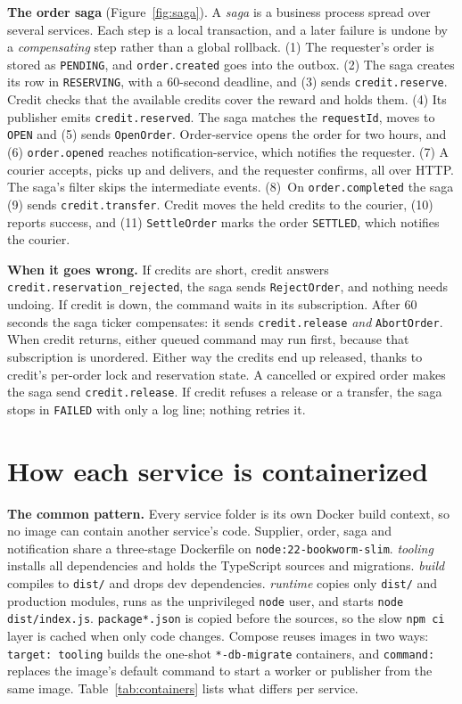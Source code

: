 \documentclass[11pt,a4paper]{article}
\newcommand{\code}[1]{\nolinkurl{#1}}
\begin{document}
\textbf{The order saga} (Figure~\ref{fig:saga}). A \emph{saga} is a business process spread over
several services. Each step is a local transaction, and a later failure is undone by a
\emph{compensating} step rather than a global rollback. (1) The requester's order is stored as
\code{PENDING}, and \code{order.created} goes into the outbox. (2) The saga creates its row in
\code{RESERVING}, with a 60-second deadline, and (3) sends \code{credit.reserve}. Credit checks
that the available credits cover the reward and holds them. (4) Its publisher emits
\code{credit.reserved}. The saga matches the \code{requestId}, moves to \code{OPEN} and (5) sends
\code{OpenOrder}. Order-service opens the order for two hours, and (6) \code{order.opened} reaches
notification-service, which notifies the requester. (7) A courier accepts, picks up and delivers,
and the requester confirms, all over HTTP. The saga's filter skips the intermediate events.
(8)~On \code{order.completed} the saga (9) sends \code{credit.transfer}. Credit moves the held
credits to the courier, (10) reports success, and (11) \code{SettleOrder} marks the order
\code{SETTLED}, which notifies the courier.

\textbf{When it goes wrong.} If credits are short, credit answers
\code{credit.reservation_rejected}, the saga sends \code{RejectOrder}, and nothing needs undoing.
If credit is down, the command waits in its subscription. After 60 seconds the saga ticker
compensates: it sends \code{credit.release} \emph{and} \code{AbortOrder}. When credit returns,
either queued command may run first, because that subscription is unordered. Either way the
credits end up released, thanks to credit's per-order lock and reservation state. A cancelled or
expired order makes the saga send \code{credit.release}. If credit refuses a release or a
transfer, the saga stops in \code{FAILED} with only a log line; nothing retries it.

\section{How each service is containerized}

\textbf{The common pattern.} Every service folder is its own Docker build context, so no image
can contain another service's code. Supplier, order, saga and notification share a three-stage
Dockerfile on \code{node:22-bookworm-slim}. \emph{tooling} installs all dependencies and holds
the TypeScript sources and migrations. \emph{build} compiles to \code{dist/} and drops dev
dependencies. \emph{runtime} copies only \code{dist/} and production modules, runs as the
unprivileged \code{node} user, and starts \code{node dist/index.js}. \code{package*.json} is copied
before the sources, so the slow \code{npm ci} layer is cached when only code changes. Compose
reuses images in two ways: \code{target: tooling} builds the one-shot \code{*-db-migrate}
containers, and \code{command:} replaces the image's default command to start a worker or
publisher from the same image. Table~\ref{tab:containers} lists what differs per service.
\end{document}
